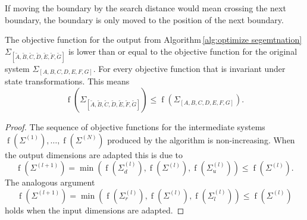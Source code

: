 \documentclass[numbers=noenddot,doctype=mastersthesis,BCOR=15mm,biblatex]{ldvbook}%
\DeclareMathOperator{\f}{f}
\newcommand{\sys}{\Sigma}
\begin{document}
If moving the boundary by the search distance would mean crossing the next boundary, the boundary is only moved to the position of the next boundary.


The objective function for the output from Algorithm\,\ref{alg:optimize segemtnation} $\Sigma_{[\tilde{A},\tilde{B},\tilde{C},\tilde{D},\tilde{E},\tilde{F},\tilde{G}]}$ is lower than or equal to the objective function for the original system $\Sigma_{[A,B,C,D,E,F,G]}$.
For every objective function that is invariant under state transformations.
This means 
\begin{equation}
	\f(\Sigma_{[\tilde{A},\tilde{B},\tilde{C},\tilde{D},\tilde{E},\tilde{F},\tilde{G}]}) \leq \f(\Sigma_{[A,B,C,D,E,F,G]})
	.
\end{equation}
\begin{proof}
	 The sequence of objective functions for the intermediate systems $\f(\sys^{(1)}),\dots,\f(\sys^{(N)})$ produced by the algorithm is non-increasing.
	 When the output dimensions are adapted this is due to  
	\begin{equation}
	\f(\sys^{(l+1)}) = \min(\f(\sys^{(l)}_{d}),\f(\sys^{(l)}),\f(\sys^{(l)}_{u})) \leq \f(\sys^{(l)})
	.
	\end{equation}
	The analogous argument 
	\begin{equation}
	\f(\sys^{(l+1)}) = \min(\f(\sys^{(l)}_{r}),\f(\sys^{(l)}),\f(\sys^{(l)}_{l})) \leq \f(\sys^{(l)})
	\end{equation} 
	holds when the input dimensions are adapted.
\end{proof}
\end{document}
